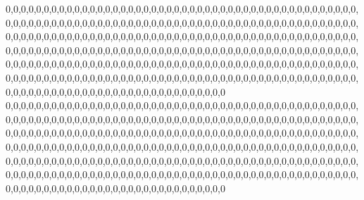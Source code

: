0,0,0,0,0,0,0,0,0,0,0,0,0,0,0,0,0,0,0,0,0,0,0,0,0,0,0,0,0,0,0,0,0,0,0,0,0,0,0,0,0,0,0,0,0,0,0,0,0,0,0,0,0,0,0,0,0,0,0,0,0,0,0,0,0,0,0,0,0,0,0,0,0,0,0,0,0,0,0,0,0,0,0,0,0,0,0,0,0,0,0,0,0,0,0,0,0,0,0,0,0,0,0,0,0,0,0,0,0,0,0,0,0,0,0,0,0,0,0,0,0,0,0,0,0,0,0,0,0,0,0,0,0,0,0,0,0,0,0,0,0,0,0,0,0,0,0,0,0,0,0,0,0,0,0,0,0,0,0,0,0,0,0,0,0,0,0,0,0,0,0,0,0,0,0,0,0,0,0,0,0,0,0,0,0,0,0,0,0,0,0,0,0,0,0,0,0,0,0,0,0,0,0,0,0,0,0,0,0,0,0,0,0,0,0,0,0,0,0,0,0,0,0,0,0,0,0,0,0,0,0,0,0,0,0,0,0,0,0,0,0,0,0,0,0,0,0,0,0,0,0,0,0,0,0,0,0,0,0,0,0,0,0,0,0,0,0,0,0,0,0,0,0,0,0,0,0,0,0,0,0,0,0,0,0,0,0,0,0,0,0,0,0,0,0,0,0,0,0,0,0,0,0,0,0
0,0,0,0,0,0,0,0,0,0,0,0,0,0,0,0,0,0,0,0,0,0,0,0,0,0,0,0,0,0,0,0,0,0,0,0,0,0,0,0,0,0,0,0,0,0,0,0,0,0,0,0,0,0,0,0,0,0,0,0,0,0,0,0,0,0,0,0,0,0,0,0,0,0,0,0,0,0,0,0,0,0,0,0,0,0,0,0,0,0,0,0,0,0,0,0,0,0,0,0,0,0,0,0,0,0,0,0,0,0,0,0,0,0,0,0,0,0,0,0,0,0,0,0,0,0,0,0,0,0,0,0,0,0,0,0,0,0,0,0,0,0,0,0,0,0,0,0,0,0,0,0,0,0,0,0,0,0,0,0,0,0,0,0,0,0,0,0,0,0,0,0,0,0,0,0,0,0,0,0,0,0,0,0,0,0,0,0,0,0,0,0,0,0,0,0,0,0,0,0,0,0,0,0,0,0,0,0,0,0,0,0,0,0,0,0,0,0,0,0,0,0,0,0,0,0,0,0,0,0,0,0,0,0,0,0,0,0,0,0,0,0,0,0,0,0,0,0,0,0,0,0,0,0,0,0,0,0,0,0,0,0,0,0,0,0,0,0,0,0,0,0,0,0,0,0,0,0,0,0,0,0,0,0,0,0,0,0,0,0,0,0,0,0,0,0,0,0,0,0,0,0,0,0,0
